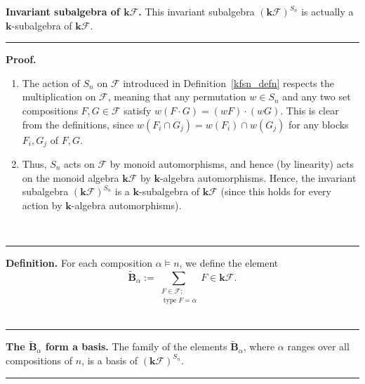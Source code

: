 \documentclass[12pt]{article}
\theoremstyle{definition}%
\newtheorem{prop}[thm]{Proposition}
\theoremstyle{definition}%
\newtheorem{defn}[thm]{Definition}
\theoremstyle{remark}%
\newcommand{\tup}[1]{\left( #1 \right)}
\newcommand{\kk}{\mathbf{k}}
\newcommand{\kf}{\kk\mathcal{F}}
\newcommand{\kfsn}{\left(\kf\right)^{S_n}}
\newcommand{\BBta}{\widetilde{\mathbf{B}}_{\alpha}}
\newcommand{\CF}{\mathcal{F}}
\newcommand{\type}{\operatorname{type}}
\newenvironment{prop}[1][Proposition]{\noindent\textbf{#1.} }{\ \rule{0.5em}{0.5em}}
\newenvironment{defn}[1][Definition]{\noindent\textbf{#1.} }{\ \rule{0.5em}{0.5em}}
\newenvironment{proof}[1][Proof]{\noindent\textbf{#1.} }{\ \rule{0.5em}{0.5em}}
\begin{document}
\begin{prop}[Invariant subalgebra of $ \kf $]
    \label{kfsn_prop1}
    This invariant subalgebra $ \kfsn $ is actually a $\kk$-subalgebra of $\kf$.
\end{prop}

\begin{proof}
    \begin{enumerate}
    \item The action of $S_n$ on $\CF$ introduced in Definition~\ref{kfsn_defn} %
	respects the multiplication on $\CF$, meaning that any permutation $w \in S_n$ and any two set compositions $F, G \in \CF$ satisfy $w\tup{F \cdot G} = \tup{wF} \cdot \tup{wG}$.
    This is clear from the definitions, since $w\tup{F_i \cap G_j} = w\tup{F_i} \cap w\tup{G_j}$ for any blocks $F_i, G_j$ of $F, G$.
    \item Thus, $S_n$ acts on $\CF$ by monoid automorphisms, and hence (by linearity) acts on the monoid algebra $\kf$ by $\kk$-algebra automorphisms.
    Hence, the invariant subalgebra $\kfsn$ is a $\kk$-subalgebra of $\kf$
	(since this holds for every action by $\kk$-algebra automorphisms).
	\qedhere
	\end{enumerate}
\end{proof}

\begin{defn}
    \label{BBta_defn}
	For each composition $\alpha \models n$, we define the element
	\[
    \BBta := \sum_{\substack{F \in \CF; \\ \type F = \alpha}} F \in \kf.
    \]
\end{defn}

\begin{prop}[The $\BBta$ form a basis]
    \label{kfsn_prop2}
    The family of the elements $\BBta$, where $\alpha$ ranges over all compositions of $n$, is a basis of $\kfsn$.
\end{prop}
\end{document}
